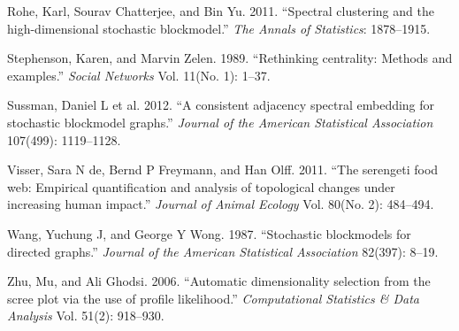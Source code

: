 \documentclass[11pt,article,oneside]{memoir}
\begin{document}
Rohe, Karl, Sourav Chatterjee, and Bin Yu. 2011. ``Spectral clustering
and the high-dimensional stochastic blockmodel.'' \emph{The Annals of
Statistics}: 1878--1915.

Stephenson, Karen, and Marvin Zelen. 1989. ``Rethinking centrality:
Methods and examples.'' \emph{Social Networks} Vol. 11(No. 1): 1--37.

Sussman, Daniel L et al. 2012. ``A consistent adjacency spectral
embedding for stochastic blockmodel graphs.'' \emph{Journal of the
American Statistical Association} 107(499): 1119--1128.

Visser, Sara N de, Bernd P Freymann, and Han Olff. 2011. ``The serengeti
food web: Empirical quantification and analysis of topological changes
under increasing human impact.'' \emph{Journal of Animal Ecology} Vol.
80(No. 2): 484--494.

Wang, Yuchung J, and George Y Wong. 1987. ``Stochastic blockmodels for
directed graphs.'' \emph{Journal of the American Statistical
Association} 82(397): 8--19.

Zhu, Mu, and Ali Ghodsi. 2006. ``Automatic dimensionality selection from
the scree plot via the use of profile likelihood.'' \emph{Computational
Statistics \& Data Analysis} Vol. 51(2): 918--930.
\end{document}
